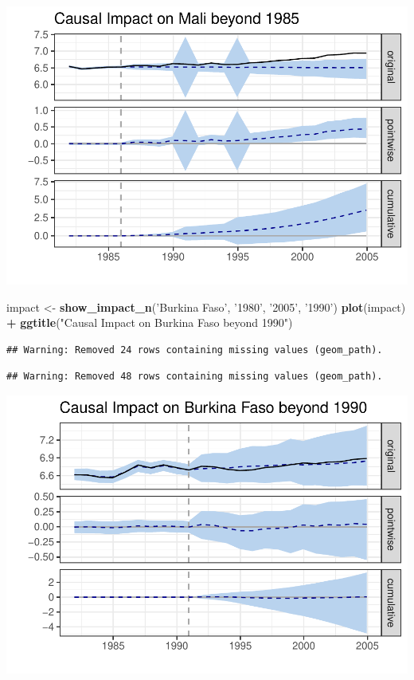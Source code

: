 \documentclass[]{article}
\newenvironment{Shaded}{\begin{snugshade}}{\end{snugshade}}
\newcommand{\KeywordTok}[1]{\textcolor[rgb]{0.13,0.29,0.53}{\textbf{#1}}}
\newcommand{\NormalTok}[1]{#1}
\newcommand{\OperatorTok}[1]{\textcolor[rgb]{0.81,0.36,0.00}{\textbf{#1}}}
\newcommand{\StringTok}[1]{\textcolor[rgb]{0.31,0.60,0.02}{#1}}
\begin{document}
\includegraphics{ProjectNotebook_files/figure-latex/unnamed-chunk-13-1.pdf}

\begin{Shaded}
\begin{Highlighting}[]
\NormalTok{impact <-}\StringTok{ }\KeywordTok{show_impact_n}\NormalTok{(}\StringTok{'Burkina Faso'}\NormalTok{, }\StringTok{'1980'}\NormalTok{, }\StringTok{'2005'}\NormalTok{, }\StringTok{'1990'}\NormalTok{)}
\KeywordTok{plot}\NormalTok{(impact) }\OperatorTok{+}\StringTok{ }\KeywordTok{ggtitle}\NormalTok{(}\StringTok{"Causal Impact on Burkina Faso beyond 1990"}\NormalTok{)}
\end{Highlighting}
\end{Shaded}

\begin{verbatim}
## Warning: Removed 24 rows containing missing values (geom_path).
\end{verbatim}

\begin{verbatim}
## Warning: Removed 48 rows containing missing values (geom_path).
\end{verbatim}

\includegraphics{ProjectNotebook_files/figure-latex/unnamed-chunk-14-1.pdf}
\end{document}
